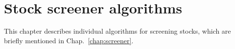\chapter{Stock screener algorithms}
\label{chap:algorithm}

This chapter describes individual algorithms for screening stocks, which are briefly mentioned in Chap.~\ref{chap:screener}.
